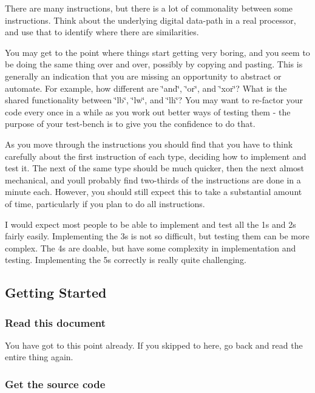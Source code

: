 There are many instructions, but there is a lot of commonality between some instructions. Think about the underlying digital data-\/path in a real processor, and use that to identify where there are similarities.

You may get to the point where things start getting very boring, and you seem to be doing the same thing over and over, possibly by copying and pasting. This is generally an indication that you are missing an opportunity to abstract or automate. For example, how different are \char`\"{}and\char`\"{}, \char`\"{}or\char`\"{}, and \char`\"{}xor\char`\"{}? What is the shared functionality between \char`\"{}lb\char`\"{}, \char`\"{}lw\char`\"{}, and \char`\"{}lh\char`\"{}? You may want to re-\/factor your code every once in a while as you work out better ways of testing them -\/ the purpose of your test-\/bench is to give you the confidence to do that.

As you move through the instructions you should find that you have to think carefully about the first instruction of each type, deciding how to implement and test it. The next of the same type should be much quicker, then the next almost mechanical, and you\textquotesingle{}ll probably find two-\/thirds of the instructions are done in a minute each. However, you should still expect this to take a substantial amount of time, particularly if you plan to do all instructions.

I would expect most people to be able to implement and test all the 1s and 2s fairly easily. Implementing the 3s is not so difficult, but testing them can be more complex. The 4s are doable, but have some complexity in implementation and testing. Implementing the 5s correctly is really quite challenging.

\subsection*{Getting Started }

\subsubsection*{Read this document}

You have got to this point already. If you skipped to here, go back and read the entire thing again.

\subsubsection*{Get the source code}


